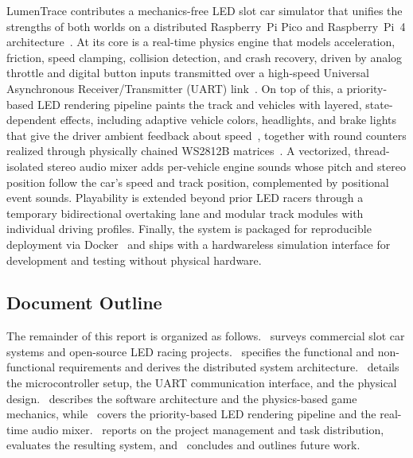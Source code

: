 \documentclass[10pt,journal,final,a4paper]{IEEEtran}
\begin{document}
LumenTrace contributes a mechanics-free LED slot car simulator that unifies the strengths of both worlds on a distributed Raspberry~Pi Pico and Raspberry~Pi~4 architecture~\cite{magpi:2024raspberry}. 
At its core is a real-time physics engine that models acceleration, friction, speed clamping, collision detection, and crash recovery, driven by analog throttle and digital button inputs transmitted over a high-speed Universal Asynchronous Receiver/Transmitter (UART) link~\cite{pena:2020uart}. On top of this, a priority-based LED rendering pipeline paints the track and vehicles with layered, state-dependent effects, including adaptive vehicle colors, headlights, and brake lights that give the driver ambient feedback about speed~\cite{meschtscherjakov:2015chaselight}, together with round counters realized through physically chained WS2812B matrices~\cite{garff:2023rpi}. 
A vectorized, thread-isolated stereo audio mixer adds per-vehicle engine sounds whose pitch and stereo position follow the car's speed and track position, complemented by positional event sounds. Playability is extended beyond prior LED racers through a temporary bidirectional overtaking lane and modular track modules with individual driving profiles. Finally, the system is packaged for reproducible deployment via Docker~\cite{merkel:2014docker} and ships with a hardwareless simulation interface for development and testing without physical hardware. 

\subsection{Document Outline}
\label{subsec:document-outline}

The remainder of this report is organized as follows.~ surveys commercial slot car systems and open-source LED racing projects.~ specifies the functional and non-functional requirements and derives the distributed system architecture.~ details the microcontroller setup, the UART communication interface, and the physical design.~ describes the software architecture and the physics-based game mechanics, while~ covers the priority-based LED rendering pipeline and the real-time audio mixer.~ reports on the project management and task distribution,~ evaluates the resulting system, and~ concludes and outlines future work.
\end{document}
